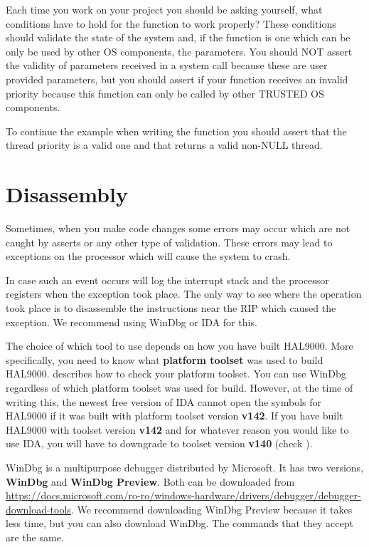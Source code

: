 \begin{appendices}
Each time you work on your project you should be asking yourself, what conditions have to hold for
the function to work properly? These conditions should validate the state of the system and, if the
function is one which can be only be used by other OS components, the parameters. You should NOT
assert the validity of parameters received in a system call because these are user provided
parameters, but you should assert if your  function receives an invalid
priority because this function can only be called by other TRUSTED OS components.

To continue the example when writing the  function you should assert that
the thread priority is a valid one and that  returns a valid non-NULL thread.

\section{Disassembly}

Sometimes, when you make code changes some errors may occur which are not caught by asserts or any
other type of validation. These errors may lead to exceptions on the processor which will cause the
system to crash.

In case such an event occurs \projectname will log the interrupt stack and the processor registers
when the exception took place. The only way to see where the operation took place is to disassemble
the instructions near the RIP which caused the exception. We recommend using WinDbg or IDA \cite{ida} for this.

The choice of which tool to use depends on how you have built HAL9000. More specifically, you need to
know what \textbf{platform toolset} was used to build HAL9000.  
describes how to check your platform toolset. 
You can use WinDbg regardless of which platform toolset was used for build. However, at the time of 
writing this, the newest free version of IDA cannot open the symbols for HAL9000 if it was built with platform toolset
version \textbf{v142}. If you have built HAL9000 with toolset version \textbf{v142} and for whatever 
reason you would like to use IDA, you will have to downgrade to toolset version \textbf{v140} 
(check ).

 \begin{tcolorbox}[width=\textwidth,colback={yellow},title={WinDbg},colbacktitle=yellow,coltitle=black]    
	WinDbg is a multipurpose debugger distributed by Microsoft. It has two versions, \textbf{WinDbg} and \textbf{WinDbg Preview}.
	Both can be downloaded from \url{https://docs.microsoft.com/ro-ro/windows-hardware/drivers/debugger/debugger-download-tools}.
	We recommend downloading WinDbg Preview because it takes less time, but you can also download WinDbg.
	The commands that they accept are the same.


\end{tcolorbox}
\end{appendices}
